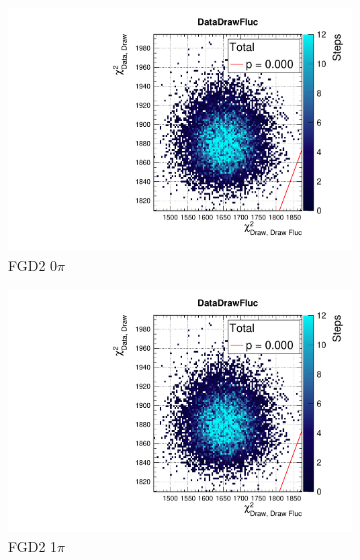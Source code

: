 \begin{figure}[h]
\begin{subfigure}[t]{0.32\textwidth}
	\includegraphics[width=\textwidth, trim={20mm 6mm 4mm 11mm}, clip,page=32]{figures/mach3/data/postpred/2017b_NewData_NewDet_UpdXsecStep_2Xsec_4Det_5Flux_0_PostPred_procs}
	\caption{FGD2 0$\pi$}
\end{subfigure}
\begin{subfigure}[t]{0.32\textwidth}
	\includegraphics[width=\textwidth, trim={20mm 6mm 4mm 11mm}, clip,page=41]{figures/mach3/data/postpred/2017b_NewData_NewDet_UpdXsecStep_2Xsec_4Det_5Flux_0_PostPred_procs}
	\caption{FGD2 1$\pi$}
\end{subfigure}
\begin{subfigure}[t]{0.32\textwidth}

\end{subfigure}
\end{figure}
